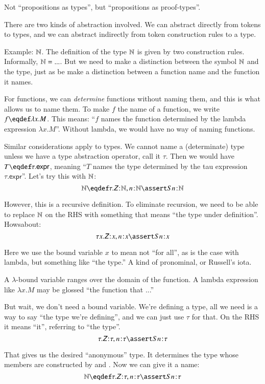 \documentclass{article}
\begin{document}
Not ``propositions as types'', but ``propositions as proof-types''.

There are two kinds of abstraction involved. We can abstract directly
from tokens to types, and we can abstract indirectly from token
construction rules to a type.

Example: \(\mathbb{N}\). The definition of the type \(\mathbb{N}\) is given by two
construction rules. Informally, \(\mathbb{N} = ...\). But we need to make a
distinction between the symbol \(\mathbb{N}\) and the type, just as be make
a distinction between a function name and the function it names.

For functions, we can \textit{determine} functions without naming
them, and this is what allows us to name them. To make \(f\) the name
of a function, we write \(f\defeq\lambda x.M\). This means: ``\(f\)
names the function determined by the lambda expression \(\lambda
x.M\)''. Without lambda, we would have no way of naming functions.

Similar considerations apply to types. We cannot name a (determinate)
type unless we have a type abstraction operator, call it \(\tau\).
Then we would have \(T\defeq \tau.\textsf{expr}\), meaning ``\(T\)
names the type determined by the tau expression
\(\tau.\textsf{expr}\)''.  Let's try this with \(\mathbb{N}\):
\[\Nat\defeq\tau.\tj{\ZNat}{\Nat}, \tj{n}{\Nat}\linfer\tj{Sn}{\Nat}\]

However, this is a recursive definition. To eliminate recursion, we need
to be able to replace \(\mathbb{N}\) on the RHS with something that means
``the type under definition''.  Howsabout:
\[\tau x.\tj{\ZNat}{x}, \tj{n}{x}\linfer\tj{Sn}{x}\]

Here we use the bound variable \(x\) to mean not ``for all'', as is
the case with lambda, but something like ``the type.'' A kind of
pronominal, or Russell's iota.

A \(\lambda\)-bound variable ranges over the domain of the function. A
lambda expression like \(\lambda x.M\) may be glossed ``the function
that ...''

But wait, we don't need a bound variable. We're defining a type, all
we need is a way to say ``the type we're defining'', and we can just
use \(\tau\) for that. On the RHS it means ``it'', referring to ``the
type''.
\[\tau.\tj{\ZNat}{\tau}, \tj{n}{\tau}\linfer\tj{Sn}{\tau}\]

That gives us the desired ``anonymous'' type. It determines the type
whose members are constructed by \ZNat and \SNat. Now we can give it a
name:
\[\Nat\defeq\tau.\tj{\ZNat}{\tau}, \tj{n}{\tau}\linfer\tj{Sn}{\tau}\]
\end{document}
